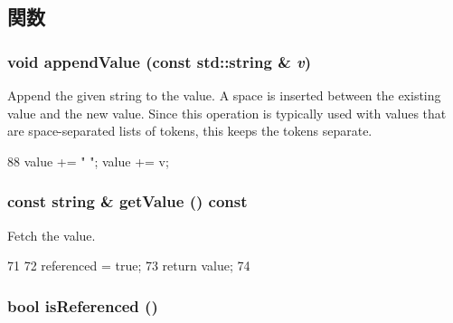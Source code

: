 \subsection{関数}
\hypertarget{classIniFile_1_1Entry_a9f2f91e32fa6eeccf8d27300994d3a6a}{
\subsubsection[{appendValue}]{\setlength{\rightskip}{0pt plus 5cm}void appendValue (const std::string \& {\em v})}}
\label{classIniFile_1_1Entry_a9f2f91e32fa6eeccf8d27300994d3a6a}
Append the given string to the value. A space is inserted between the existing value and the new value. Since this operation is typically used with values that are space-\/separated lists of tokens, this keeps the tokens separate. 


\begin{DoxyCode}
88 { value += " "; value += v; }
\end{DoxyCode}
\hypertarget{classIniFile_1_1Entry_afe5c74ba0aa0f51d7ee58011f3d0f026}{
\subsubsection[{getValue}]{\setlength{\rightskip}{0pt plus 5cm}const string \& getValue () const}}
\label{classIniFile_1_1Entry_afe5c74ba0aa0f51d7ee58011f3d0f026}


Fetch the value. 


\begin{DoxyCode}
71 {
72     referenced = true;
73     return value;
74 }
\end{DoxyCode}
\hypertarget{classIniFile_1_1Entry_a9bb33643f50132c7eb254763f4509d23}{
\subsubsection[{isReferenced}]{\setlength{\rightskip}{0pt plus 5cm}bool isReferenced ()}}
\label{classIniFile_1_1Entry_a9bb33643f50132c7eb254763f4509d23}


